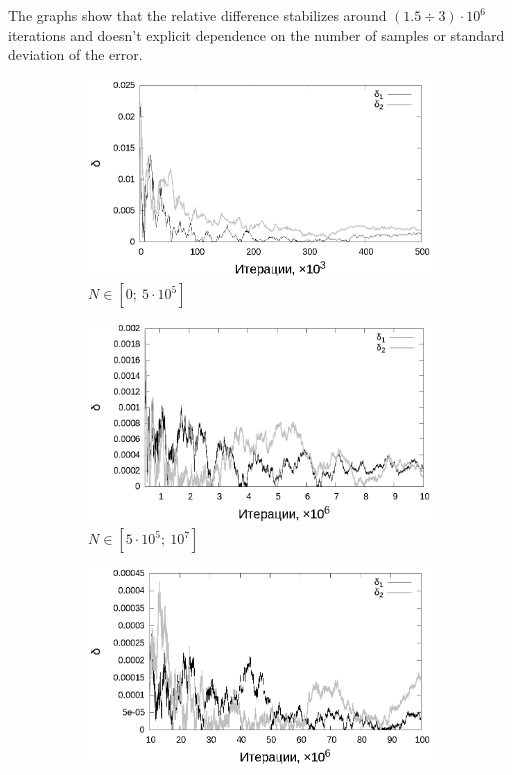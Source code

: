 \documentclass[11pt,a4paper]{article}
\theoremstyle{definition}
\begin{document}
The graphs show that the relative difference stabilizes around $(1.5 \div 3) \cdot 10^6$
iterations and doesn't explicit dependence on the number of samples or standard
deviation of the error.

\begin{figure}[h!]
  \begin{subfigure}[b]{0.3\textwidth}
    \includegraphics[width=\textwidth]{figs/classic/linear_log_1x_2_samples_10_variance_10_norm.log_0_500.eps}
    \caption{$N \in [0;~5 \cdot 10^5]$}
    \label{fig:classic_var10_n10_begin}
  \end{subfigure}
  \begin{subfigure}[b]{0.3\textwidth}
    \includegraphics[width=\textwidth]{figs/classic/linear_log_1x_2_samples_10_variance_10_norm.log_500_10000.eps}
    \caption{$N \in [5 \cdot 10^5;~10^7]$}
    \label{fig:classic_var10_n10_middle}
  \end{subfigure}
  \begin{subfigure}[b]{0.3\textwidth}
    \includegraphics[width=\textwidth]{figs/classic/linear_log_1x_2_samples_10_variance_10_norm.log_end.eps}

\end{subfigure}
\end{figure}
\end{document}
